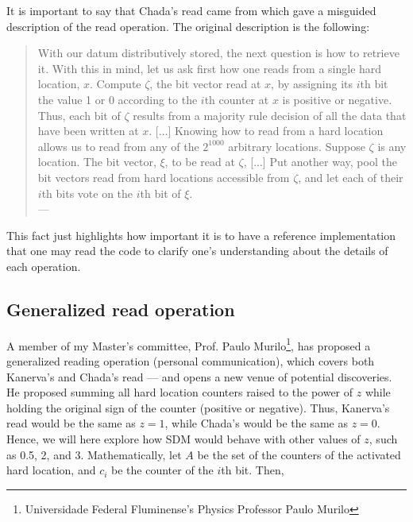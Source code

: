 It is important to say that Chada's read came from \citet{Anwar2003} which gave a misguided description of the read operation. The original description is the following:

\begin{samepage}
\begin{quote}
With our datum distributively stored, the next question is how to retrieve it. With this in mind, let us ask first how one reads from a single hard location, $x$. Compute $\zeta$, the bit vector read at $x$, by assigning its $i$th bit the value 1 or 0 according to the $i$th counter at $x$ is positive or negative. Thus, each bit of $\zeta$ results from a majority rule decision of all the data that have been written at $x$. [...] Knowing how to read from a hard location allows us to read from any of the $2^{1000}$ arbitrary locations. Suppose $\zeta$ is any location. The bit vector, $\xi$, to be read at $\zeta$, [...] Put another way, pool the bit vectors read from hard locations accessible from $\zeta$, and let each of their $i$th bits vote on the $i$th bit of $\xi$. \\
\hfill --- \citet[p.342]{Anwar2003}
\end{quote}
\end{samepage}

This fact just highlights how important it is to have a reference implementation that one may read the code to clarify one's understanding about the details of each operation.

\subsection{Generalized read operation}

A member of my Master's committee, Prof. Paulo Murilo\footnote{Universidade Federal Fluminense's Physics Professor Paulo Murilo}, has proposed a generalized reading operation (personal communication), which covers both Kanerva's and Chada's read --- and opens a new venue of potential discoveries. He proposed summing all hard location counters raised to the power of $z$ while holding the original sign of the counter (positive or negative). Thus, Kanerva's read would be the same as $z=1$, while Chada's would be the same as $z=0$. Hence, we will here explore how SDM would behave with other values of $z$, such as 0.5, 2, and 3. Mathematically, let $A$ be the set of the counters of the activated hard location, and $c_i$ be the counter of the $i$th bit. Then,


